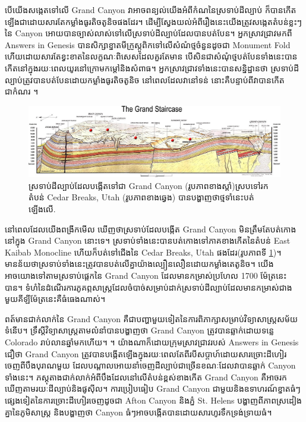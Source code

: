 \documentclass[10pt,twocolumn,letterpaper]{article}
\begin{document}
បើយើងសង្កេតទៅលើ Grand Canyon វាអាចពន្យល់យើងអំពីកំណនៃស្រទាប់ដីល្បាប់ ក៏បានកើតឡើងជាដោយសារតែកម្លាំងធូរតិចតូនិចផងដែរ។ ដើម្បីស្វែងយល់អំពីរឿងនេះយើងត្រូវសង្កេតតំបន់ខ្លះៗនៃ Canyon អោយបានច្បាស់លាស់ទៅលើស្រទាប់ដីល្បាប់ដែលបានបត់បែន។ អ្នកស្រាវជ្រាវមកពី Answers in Genesis \cite{42} បានសិក្សាខ្នាតមីក្រូស្កូពិកទៅលើសំណំថ្មចំនួនដូចជា Monument Fold ហើយដោយសារតែខ្វះខាតនៃលក្ខណៈពិសេសដែលគួរតែមាន បើសិនជាសំណុំថ្មបត់បែនទាំងនេះបានកើតនៅក្នុងរយៈពេលយូរនៅក្រោមកម្តៅនិងសំពាធ។ អ្នកស្រាវជ្រាវទាំងនេះបានសន្និដ្ឋានថា ស្រទាប់ដីល្បាប់ត្រូវបានបត់បែនដោយកម្លាំងធូរតិចតូនិច នៅពេលដែលវានៅទន់ នោះគឺបន្ទាប់ពីវាបានកើតជាកំណរ \cite{43}។

\begin{figure}
\begin{center}
\includegraphics[width=1\textwidth]{Grand_Staircase-big.jpg}
\end{center}
   \caption{ស្រទាប់ដីល្បាប់ដែលបង្កើតទៅជា Grand Canyon (រូបភាពខាងស្តាំ)ស្របទៅរកតំបន់ Cedar Breaks, Utah (រូបភាពខាងឆ្វេង) បានបង្ហាញថាថ្មទាំនេះបត់ឡើងលើ\cite{50}.}
\label{fig:4}
\end{figure}

នៅពេលដែលយើងពង្រីកមើល ឃើញថាស្រទាប់ដែលបង្កើត Grand Canyon មិនត្រឹមតែបត់កោងនៅក្នុង Grand Canyon នោះទេ។ ស្រទាប់ទាំងនេះបានបត់កោងទៅភាគខាងកើតនៃតំបន់ East Kaibab Monocline \cite{46} ហើយក៏បត់ទៅជើងនៃ Cedar Breaks, Utah ផងដែរ(រូបភាពទី \ref{fig:4})។ មានន័យថាស្រទាប់ទាំងនេះត្រូវបានបត់លើគ្នាយ៉ាងល្បឿនលឿនដោយកម្លាំងតេតូនិច។ យើងអាចយោងទៅតាមស្រទាប់ផ្តេកនៃ Grand Canyon ដែលមានកម្រាស់ប្រហែល 1700 ម៉ែត្រនេះបាន។ ទំហំនៃដំណើរការភូគព្ភសាស្ត្រដែលចំបាច់សម្រាប់ដាក់ស្រទាប់ដីល្បាប់ដែលមានកម្រាស់ជាងមួយគីឡីម៉ែត្រនេះគឺធំធេងណាស់។ 

ពត៍មានជាក់លាក់នៃ Grand Canyon គឺជាបញ្ហាមួយទៀតនៃការពិភាក្សាសម្រាប់វិទ្យាសាស្ត្រសម័យទំនើប។ ទ្រឹស្តីវិទ្យាសាស្ត្រតាមលំនាំបានបង្ហាញថា Grand Canyon ត្រូវបានឆ្លាក់ដោយទន្លេ Colorado រាប់លានឆ្នាំមកហើយ។ \cite{47}។ យ៉ាងណាក៏ដោយក្រុមស្រាវជ្រាវរបស់ Answers in Genesis ជឿថា Grand Canyon ត្រូវបានបង្កើតឡើងក្នុងរយៈពេលតែពីរបីសប្តាហ៍ដោយសារច្រោះដីហៀរចេញពីបឹងបុរាណមួយ ដែលបណ្តាលអោយនាំចេញដីល្បាប់ជាច្រើនខណៈដែលវាបានឆ្លាក់ Canyon ទាំងនេះ។ ភស្តុតាងជាក់លាក់អំពីបឹងដែលនៅលើតំបន់ខ្ពស់ខាងកើត Grand Canyon គឺអាចរកឃើញតាមរយៈដីល្បាប់និងផូសុីល។ ការប្រៀបធៀប Grand Canyon ជាមួយនិងឧទាហរណ៍ខ្នាតធំៗផ្សេងទៀតនៃការច្រោះដីហៀរចេញដូចជា Afton Canyon និងភ្នំ St. Helens បង្ហាញពីភាពស្រដៀងគ្នានៃភូមិសាស្ត្រ និងបង្ហាញថា Canyon ធំៗអាចបង្កើតបានដោយសារហូរទឹកទ្រង់ទ្រាយធំ\cite{48}។
\end{document}
